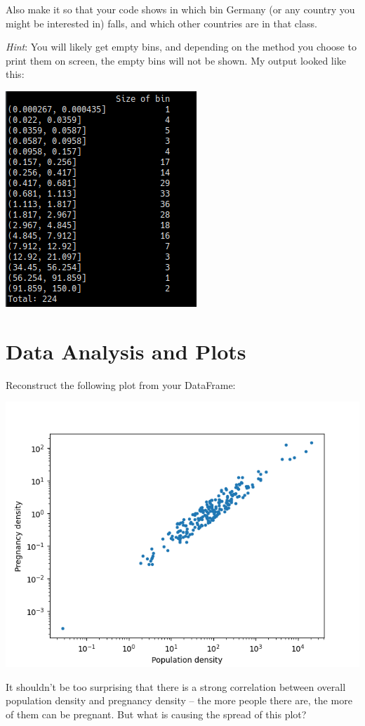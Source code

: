 \documentclass[
	english,
	fontsize=10pt,
	parskip=half,
	titlepage=true,
	DIV=12
]{scrartcl}
\begin{document}
Also make it so that your code shows in which bin Germany (or any country you might be interested in) falls, and which other countries are in that class.

\emph{Hint}: You will likely get empty bins, and depending on the method you choose to print them on screen, the empty bins will not be shown. My output looked like this:
\begin{center}
	\includegraphics[width=.3\linewidth]{./Bin-Sizes}
\end{center}

\section{Data Analysis and Plots}
Reconstruct the following plot from your DataFrame:
\begin{center}
	\includegraphics[width=.7\linewidth]{./PopVsPreg}
\end{center}

It shouldn't be too surprising that there is a strong correlation between overall population density and pregnancy density -- the more people there are, the more of them can be pregnant. But what is causing the spread of this plot?
\end{document}
